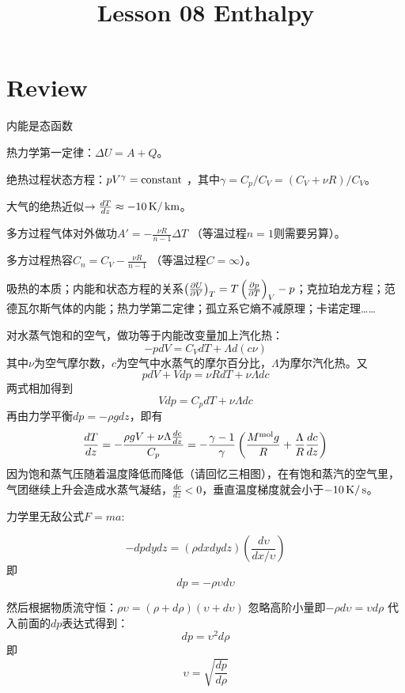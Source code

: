 \documentclass[CJK]{beamer}
\title{Lesson 08 Enthalpy}
\author{}
\date{}
\begin{document}

\section{Review}

\begin{frame}
\bch
\bitem
\item{内能是态函数}
\item{热力学第一定律：$\Delta U = A + Q$。}
\item{绝热过程状态方程：$pV^\gamma = \mathrm{constant}$ ，其中$\gamma = C_p/C_V = (C_V + \nu R)/C_V$。}
\item{大气的绝热近似$\rightarrow \frac{dT}{dz} \approx -10 \,\mathrm{K}/\,\mathrm{km}$。}
\item{多方过程气体对外做功$A' = -\frac{\nu R}{n-1}\Delta T$ （等温过程$n=1$则需要另算）。}
\item{多方过程热容$C_n =C_V -\frac{\nu R}{n-1}$ （等温过程$C = \infty$）。}
\item{吸热的本质；内能和状态方程的关系$\left(\frac{\partial U}{\partial V}\right)_{T} = T\left(\frac{\partial p}{\partial T}\right)_{V} - p$；克拉珀龙方程；范德瓦尔斯气体的内能；热力学第二定律；孤立系它熵不减原理；卡诺定理……}

\eitem
\ech
\end{frame}

\begin{frame}
\bch
{\small
对水蒸气饱和的空气，做功等于内能改变量加上汽化热：
$$ -pdV = C_V dT + \Lambda d(c\nu) $$
其中$\nu$为空气摩尔数，$c$为空气中水蒸气的摩尔百分比，$\Lambda$为摩尔汽化热。又
$$pdV + Vdp = \nu R dT + \nu \Lambda dc$$
两式相加得到
$$ Vdp = C_p  dT + \nu \Lambda dc $$
再由力学平衡$ dp = -\rho g dz$，即有
$$ \frac{dT}{dz} =-\frac{\rho g V + \nu\Lambda\frac{dc}{dz}}{C_p} = -\frac{\gamma-1}{\gamma}\left(\frac{M^{\rm mol}g}{R}+\frac{\Lambda}{R}\frac{dc}{dz}\right)$$
因为饱和蒸气压随着温度降低而降低（请回忆三相图），在有饱和蒸汽的空气里，气团继续上升会造成水蒸气凝结，$ \frac{dc}{dz} < 0 $，垂直温度梯度就会小于$-10\,\mathrm{K}/\,\mathrm{s}$。
}
\ech
\end{frame}


\begin{frame}
\bch


{\scriptsize
力学里无敌公式$F = ma$:

$$ -dp dy dz = (\rho dx dy dz) \left(\frac{d\upsilon}{dx/\upsilon}\right) $$
即
$$ dp = - \rho \upsilon d\upsilon $$

然后根据物质流守恒：$ \rho \upsilon = (\rho + d\rho)(\upsilon+d\upsilon)$
忽略高阶小量即$ -\rho d\upsilon = \upsilon d\rho$
代入前面的$dp$表达式得到：
$$ dp = \upsilon ^2 d\rho$$
即
$$\upsilon = \sqrt{\frac{dp}{d\rho}}$$
}
\ech
\end{frame}
\end{document}
